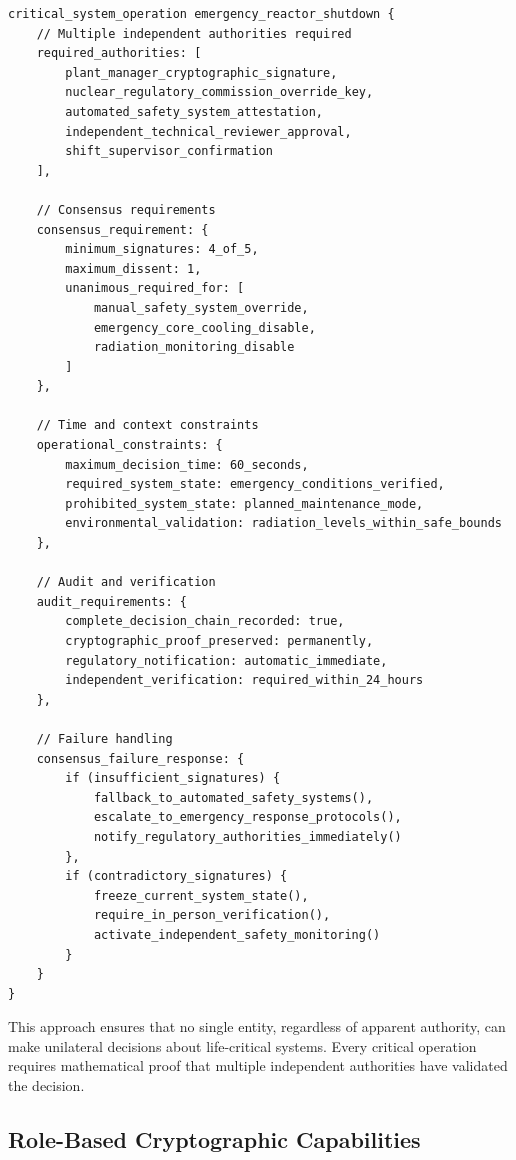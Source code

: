 \begin{lstlisting}[language=rift, caption=Multi-Party Consensus for Nuclear Plant Emergency Systems]
critical_system_operation emergency_reactor_shutdown {
    // Multiple independent authorities required
    required_authorities: [
        plant_manager_cryptographic_signature,
        nuclear_regulatory_commission_override_key,
        automated_safety_system_attestation,
        independent_technical_reviewer_approval,
        shift_supervisor_confirmation
    ],
    
    // Consensus requirements
    consensus_requirement: {
        minimum_signatures: 4_of_5,
        maximum_dissent: 1,
        unanimous_required_for: [
            manual_safety_system_override,
            emergency_core_cooling_disable,
            radiation_monitoring_disable
        ]
    },
    
    // Time and context constraints
    operational_constraints: {
        maximum_decision_time: 60_seconds,
        required_system_state: emergency_conditions_verified,
        prohibited_system_state: planned_maintenance_mode,
        environmental_validation: radiation_levels_within_safe_bounds
    },
    
    // Audit and verification
    audit_requirements: {
        complete_decision_chain_recorded: true,
        cryptographic_proof_preserved: permanently,
        regulatory_notification: automatic_immediate,
        independent_verification: required_within_24_hours
    },
    
    // Failure handling
    consensus_failure_response: {
        if (insufficient_signatures) {
            fallback_to_automated_safety_systems(),
            escalate_to_emergency_response_protocols(),
            notify_regulatory_authorities_immediately()
        },
        if (contradictory_signatures) {
            freeze_current_system_state(),
            require_in_person_verification(),
            activate_independent_safety_monitoring()
        }
    }
}
\end{lstlisting}

This approach ensures that no single entity, regardless of apparent authority, can make unilateral decisions about life-critical systems. Every critical operation requires mathematical proof that multiple independent authorities have validated the decision.

\subsection{Role-Based Cryptographic Capabilities}

